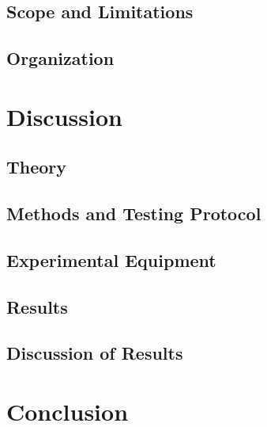 \documentclass[twocolumn, amsmath, amssymb, aps, pra, 12pt, floatfix, showpacs]{revtex4-1}
\begin{document}
\subsection{\label{sec:introduction:scopeandlimitations}Scope and Limitations}


\subsection{\label{sec:introduction:organization}Organization}



\section{\label{sec:discussion}Discussion}


\subsection{\label{sec:discussion:theory}Theory}


\subsection{\label{sec:discussion:testing}Methods and Testing Protocol}


\subsection{\label{sec:discussion:equipment}Experimental Equipment}


\subsection{\label{sec:discussion:results}Results}


\subsection{\label{sec:discussion:resultdiscussion}Discussion of Results}



\section{\label{sec:conclusion}Conclusion}

\end{document}
